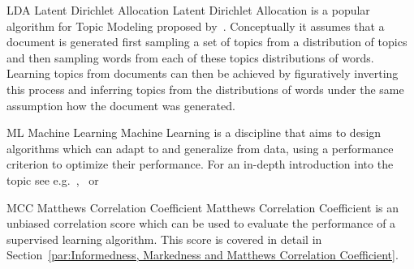 

  {LDA}
  {Latent Dirichlet Allocation}
  {Latent Dirichlet Allocation is a popular algorithm for \gls{Topic Modeling} proposed by~\cite{Blei:2003aa}. Conceptually it assumes that a document is generated first sampling a set of topics from a distribution of topics and then sampling words from each of these topics distributions of words. Learning topics from documents can then be achieved by figuratively inverting this process and inferring topics from the distributions of words under the same assumption how the document was generated.}




  {ML}
  {Machine Learning}
  {Machine Learning is a discipline that aims to design algorithms which can adapt to and generalize from data, using a performance criterion to optimize their performance. For an in-depth introduction into the topic see e.g.~\cite{Murphy:2012aa},~\cite{Bishop:2006aa} or~\cite{Alpaydin:2014aa}} %

  {MCC}
  {Matthews Correlation Coefficient}
  {Matthews Correlation Coefficient is an unbiased correlation score which can be used to evaluate the performance of a supervised learning algorithm. This score is covered in detail in Section~\ref{par:Informedness, Markedness and Matthews Correlation Coefficient}.} %


